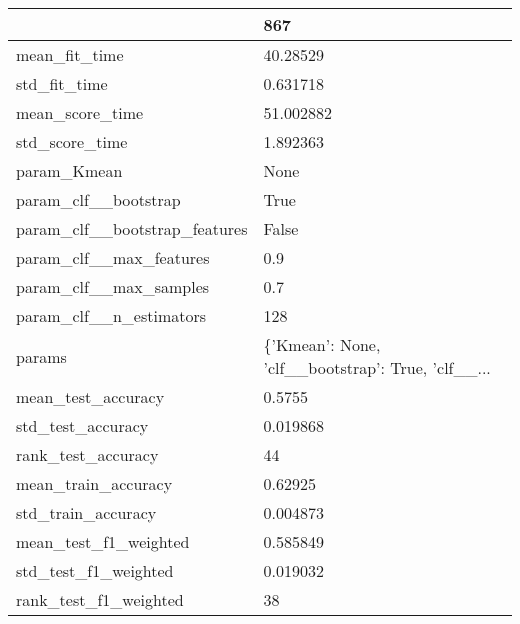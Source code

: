 \begin{tabular}{ll}
\toprule
{} &                                                867 \\
\midrule
mean\_fit\_time                 &                                           40.28529 \\
std\_fit\_time                  &                                           0.631718 \\
mean\_score\_time               &                                          51.002882 \\
std\_score\_time                &                                           1.892363 \\
param\_Kmean                   &                                               None \\
param\_clf\_\_bootstrap          &                                               True \\
param\_clf\_\_bootstrap\_features &                                              False \\
param\_clf\_\_max\_features       &                                                0.9 \\
param\_clf\_\_max\_samples        &                                                0.7 \\
param\_clf\_\_n\_estimators       &                                                128 \\
params                        &  \{'Kmean': None, 'clf\_\_bootstrap': True, 'clf\_\_... \\
mean\_test\_accuracy            &                                             0.5755 \\
std\_test\_accuracy             &                                           0.019868 \\
rank\_test\_accuracy            &                                                 44 \\
mean\_train\_accuracy           &                                            0.62925 \\
std\_train\_accuracy            &                                           0.004873 \\
mean\_test\_f1\_weighted         &                                           0.585849 \\
std\_test\_f1\_weighted          &                                           0.019032 \\
rank\_test\_f1\_weighted         &                                                 38 \\

\end{tabular}
